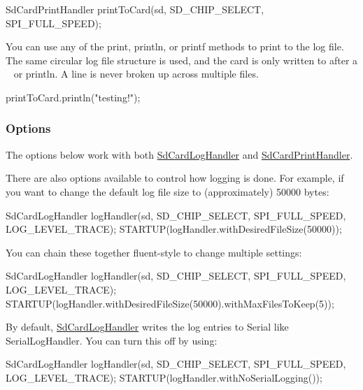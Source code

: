 \begin{DoxyCode}
SdCardPrintHandler printToCard(sd, SD\_CHIP\_SELECT, SPI\_FULL\_SPEED);
\end{DoxyCode}


You can use any of the print, println, or printf methods to print to the log file. The same circular log file structure is used, and the card is only written to after a ~\newline
 or println. A line is never broken up across multiple files.


\begin{DoxyCode}
printToCard.println("testing!");
\end{DoxyCode}


\subsubsection*{Options}

The options below work with both \mbox{\hyperlink{class_sd_card_log_handler}{Sd\+Card\+Log\+Handler}} and \mbox{\hyperlink{class_sd_card_print_handler}{Sd\+Card\+Print\+Handler}}.

There are also options available to control how logging is done. For example, if you want to change the default log file size to (approximately) 50000 bytes\+:


\begin{DoxyCode}
SdCardLogHandler logHandler(sd, SD\_CHIP\_SELECT, SPI\_FULL\_SPEED, LOG\_LEVEL\_TRACE);
STARTUP(logHandler.withDesiredFileSize(50000));
\end{DoxyCode}


You can chain these together fluent-\/style to change multiple settings\+:


\begin{DoxyCode}
SdCardLogHandler logHandler(sd, SD\_CHIP\_SELECT, SPI\_FULL\_SPEED, LOG\_LEVEL\_TRACE);
STARTUP(logHandler.withDesiredFileSize(50000).withMaxFilesToKeep(5));
\end{DoxyCode}


By default, \mbox{\hyperlink{class_sd_card_log_handler}{Sd\+Card\+Log\+Handler}} writes the log entries to Serial like Serial\+Log\+Handler. You can turn this off by using\+:


\begin{DoxyCode}
SdCardLogHandler logHandler(sd, SD\_CHIP\_SELECT, SPI\_FULL\_SPEED, LOG\_LEVEL\_TRACE);
STARTUP(logHandler.withNoSerialLogging());
\end{DoxyCode}


